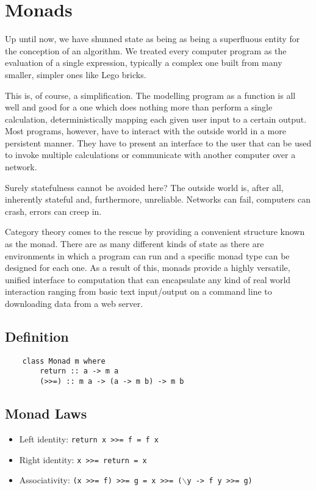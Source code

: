 \section{Monads}
Up until now, we have shunned state as being as being a superfluous entity for the conception of an algorithm. We treated every computer program as the evaluation of a single expression, typically a complex one built from many smaller, simpler ones like Lego bricks.

This is, of course, a simplification. The modelling program as a function is all well and good for a one which does nothing more than perform a single calculation, deterministically mapping each given user input to a certain output. Most programs, however, have to interact with the outside world in a more persistent manner. They have to present an interface to the user that can be used to invoke multiple calculations or communicate with another computer over a network.

Surely statefulness cannot be avoided here? The outside world is, after all, inherently stateful and, furthermore, unreliable. Networks can fail, computers can crash, errors can creep in.

Category theory comes to the rescue by providing a convenient structure known as the monad. There are  as many different kinds of state as there are environments in which a program can run and a specific monad type can be designed for each one. As a result of this, monads provide a highly versatile, unified interface to computation that can encapsulate any kind of real world interaction ranging from basic text input/output on a command line to downloading data from a web server.

\subsection{Definition}
\begin{lstlisting}
    class Monad m where
        return :: a -> m a
        (>>=) :: m a -> (a -> m b) -> m b
\end{lstlisting}
\subsection{Monad Laws}
\begin{itemize}
    \item Left identity: \texttt{return x >>= f = f x}
    \item Right identity: \texttt{x >>= return = x}
    \item Associativity: \texttt{(x >>= f) >>= g = x >>= ($\backslash$y -> f y >>= g)}
\end{itemize}


